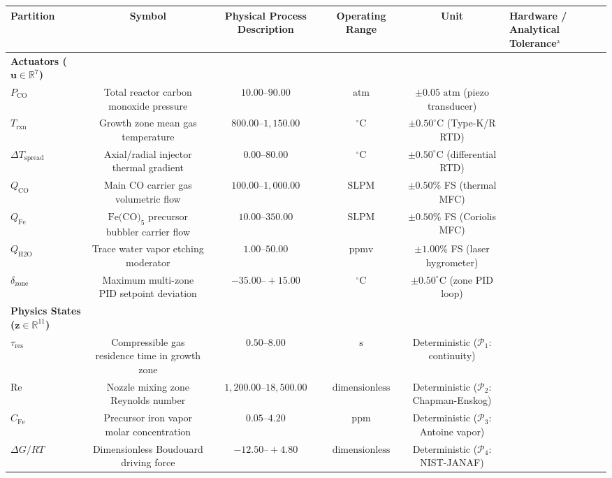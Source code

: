 \documentclass[10pt,journal,onecolumn]{IEEEtran}
\begin{document}
\begin{table}[htbp]\centering\footnotesize
\begin{tabular}{lcccc}\toprule
Partition & Symbol & Physical Process Description & Operating Range & Unit & Hardware / Analytical Tolerance$^{\text{a}}$ \\
\midrule
\textbf{Actuators ($\mathbf{u} \in \mathbb{R}^7$)} &  &  &  &  \\
$P_{\text{CO}}$ & Total reactor carbon monoxide pressure & $10.00\text{--}90.00$ & $\text{atm}$ & $\pm 0.05\text{ atm}$ (piezo transducer) \\
$T_{\text{rxn}}$ & Growth zone mean gas temperature & $800.00\text{--}1,150.00$ & $^\circ\text{C}$ & $\pm 0.50^\circ\text{C}$ (Type-K/R RTD) \\
$\Delta T_{\text{spread}}$ & Axial/radial injector thermal gradient & $0.00\text{--}80.00$ & $^\circ\text{C}$ & $\pm 0.50^\circ\text{C}$ (differential RTD) \\
$Q_{\text{CO}}$ & Main $\text{CO}$ carrier gas volumetric flow & $100.00\text{--}1,000.00$ & $\text{SLPM}$ & $\pm 0.50\%$ FS (thermal MFC) \\
$Q_{\text{Fe}}$ & $\text{Fe(CO)}_5$ precursor bubbler carrier flow & $10.00\text{--}350.00$ & $\text{SLPM}$ & $\pm 0.50\%$ FS (Coriolis MFC) \\
$Q_{\text{H2O}}$ & Trace water vapor etching moderator & $1.00\text{--}50.00$ & $\text{ppmv}$ & $\pm 1.00\%$ FS (laser hygrometer) \\
$\delta_{\text{zone}}$ & Maximum multi-zone PID setpoint deviation & $-35.00\text{--}+15.00$ & $^\circ\text{C}$ & $\pm 0.50^\circ\text{C}$ (zone PID loop) \\
\textbf{Physics States ($\mathbf{z} \in \mathbb{R}^{11}$)} &  &  &  &  \\
$\tau_{\text{res}}$ & Compressible gas residence time in growth zone & $0.50\text{--}8.00$ & $\text{s}$ & Deterministic ($\mathcal{P}_1$: continuity) \\
$\text{Re}$ & Nozzle mixing zone Reynolds number & $1,200.00\text{--}18,500.00$ & $\text{dimensionless}$ & Deterministic ($\mathcal{P}_2$: Chapman-Enskog) \\
$C_{\text{Fe}}$ & Precursor iron vapor molar concentration & $0.05\text{--}4.20$ & $\text{ppm}$ & Deterministic ($\mathcal{P}_3$: Antoine vapor) \\
$\Delta G / RT$ & Dimensionless Boudouard driving force & $-12.50\text{--}+4.80$ & $\text{dimensionless}$ & Deterministic ($\mathcal{P}_4$: NIST-JANAF) \\

\end{tabular}
\end{table}
\end{document}

